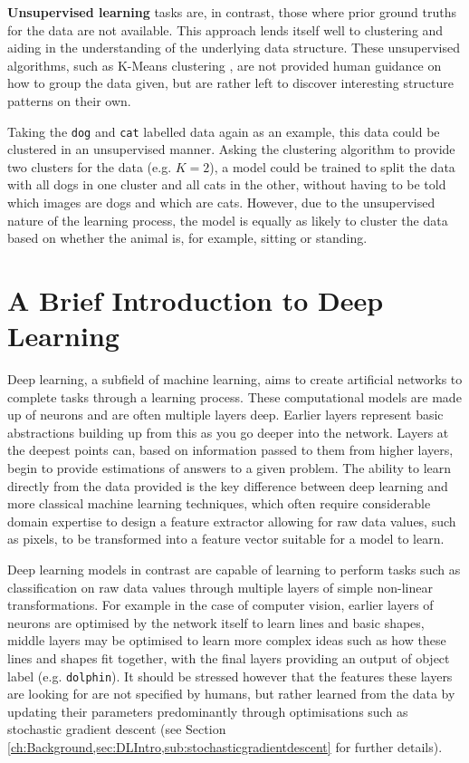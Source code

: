 \textbf{Unsupervised learning} tasks are, in contrast, those where prior ground truths for the data are not available. This approach lends itself well to clustering and aiding in the understanding of the underlying data structure. These unsupervised algorithms, such as K-Means clustering \cite{hartigan_algorithm_1979}, are not provided human guidance on how to group the data given, but are rather left to discover interesting structure patterns on their own. 

Taking the \texttt{dog} and \texttt{cat} labelled data again as an example, this data could be clustered in an unsupervised manner. Asking the clustering algorithm to provide two clusters for the data  (e.g. $K = 2$), a model could be trained to split the data with all dogs in one cluster and all cats in the other, without having to be told which images are dogs and which are cats. However, due to the unsupervised nature of the learning process, the model is equally as likely to cluster the data based on whether the animal is, for example, sitting or standing. 

\section{A Brief Introduction to Deep Learning}\label{ch:Background,sec:DLIntro}

Deep learning, a subfield of machine learning, aims to create artificial networks to complete tasks through a learning process. These computational models are made up of neurons and are often multiple layers deep. Earlier layers represent basic abstractions building up from this as you go deeper into the network. Layers at the deepest points can, based on information passed to them from higher layers, begin to provide estimations of answers to a given problem. The ability to learn directly from the data provided is the key difference between deep learning and more classical machine learning techniques, which often require considerable domain expertise to design a feature extractor allowing for raw data values, such as pixels, to be transformed into a feature vector suitable for a model to learn.

Deep learning models in contrast are capable of learning to perform tasks such as classification on raw data values through multiple layers of simple non-linear transformations. For example in the case of computer vision, earlier layers of neurons are optimised by the network itself to learn lines and basic shapes, middle layers may be optimised to learn more complex ideas such as how these lines and shapes fit together, with the final layers providing an output of object label (e.g. \texttt{dolphin}). It should be stressed however that the features these layers are looking for are not specified by humans, but rather learned from the data by updating their parameters predominantly through optimisations such as stochastic gradient descent (see Section \ref{ch:Background,sec:DLIntro,sub:stochasticgradientdescent} for further details).

